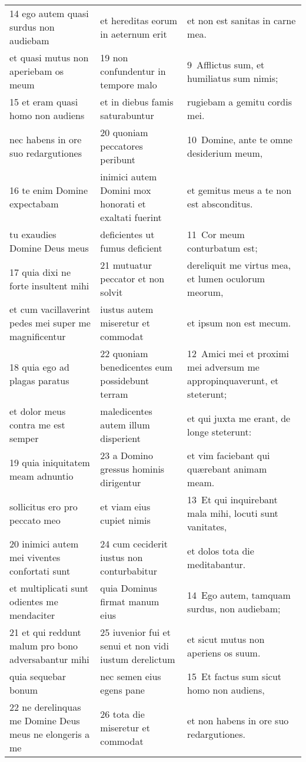 \documentclass{article}
\begin{document}
\begin{longtable}{@{}p{}p{}p{}@{}}
14 ego autem quasi surdus non audiebam	&	et hereditas eorum in aeternum erit	&	et non est sanitas in carne mea.	\\
et quasi mutus non aperiebam os meum	&	19 non confundentur in tempore malo	&	9 Afflictus sum, et humiliatus sum nimis;	\\
15 et eram quasi homo non audiens	&	et in diebus famis saturabuntur	&	rugiebam a gemitu cordis mei.	\\
nec habens in ore suo redargutiones	&	20 quoniam peccatores peribunt	&	10 Domine, ante te omne desiderium meum,	\\
16 te enim Domine expectabam	&	inimici autem Domini mox honorati et exaltati fuerint	&	et gemitus meus a te non est absconditus.	\\
tu exaudies Domine Deus meus	&	deficientes ut fumus deficient	&	11 Cor meum conturbatum est;	\\
17 quia dixi ne forte insultent mihi	&	21 mutuatur peccator et non solvit	&	dereliquit me virtus mea, et lumen oculorum meorum,	\\
et cum vacillaverint pedes mei super me magnificentur	&	iustus autem miseretur et commodat	&	et ipsum non est mecum.	\\
18 quia ego ad plagas paratus	&	22 quoniam benedicentes eum possidebunt terram	&	12 Amici mei et proximi mei adversum me appropinquaverunt, et steterunt;	\\
et dolor meus contra me est semper	&	maledicentes autem illum disperient	&	et qui juxta me erant, de longe steterunt:	\\
19 quia iniquitatem meam adnuntio	&	23 a Domino gressus hominis dirigentur	&	et vim faciebant qui quærebant animam meam.	\\
sollicitus ero pro peccato meo	&	et viam eius cupiet nimis	&	13 Et qui inquirebant mala mihi, locuti sunt vanitates,	\\
20 inimici autem mei viventes confortati sunt	&	24 cum ceciderit iustus non conturbabitur	&	et dolos tota die meditabantur.	\\
et multiplicati sunt odientes me mendaciter	&	quia Dominus firmat manum eius	&	14 Ego autem, tamquam surdus, non audiebam;	\\
21 et qui reddunt malum pro bono adversabantur mihi	&	25 iuvenior fui et senui et non vidi iustum derelictum	&	et sicut mutus non aperiens os suum.	\\
quia sequebar bonum	&	nec semen eius egens pane	&	15 Et factus sum sicut homo non audiens,	\\
22 ne derelinquas me Domine Deus meus ne elongeris a me	&	26 tota die miseretur et commodat	&	et non habens in ore suo redargutiones.	\\

\end{longtable}
\end{document}
